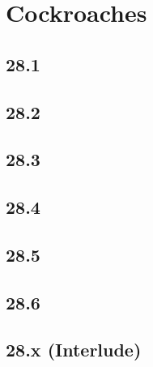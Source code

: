 \part{Cockroaches}
 \chapter{28.1}
 \chapter{28.2}
 \chapter{28.3}
 \chapter{28.4}
 \chapter{28.5}
 \chapter{28.6}
 \chapter{28.x (Interlude)}








